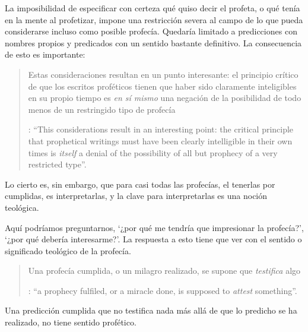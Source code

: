 La imposibilidad de especificar con certeza qué quiso decir el profeta, o qué tenía en la mente al profetizar, impone una restricción severa al campo de lo que pueda considerarse incluso como posible profecía. Quedaría limitado a predicciones con nombres propios y predicados con un sentido bastante definitivo. La consecuencia de esto es importante: \blockquote[{\Cite[31]{anscombe2008faith:prophandmi}}: \enquote{This considerations result in an interesting point: the critical principle that prophetical writings must have been clearly intelligible in their own times is \emph{itself} a denial of the possibility of all but prophecy of a very restricted type}.]{Estas consideraciones resultan en un punto interesante: el principio crítico de que los escritos proféticos tienen que haber sido claramente inteligibles en su propio tiempo es \emph{en sí mismo} una negación de la posibilidad de todo menos de un restringido tipo de profecía}. Lo cierto es, sin embargo, que para casi todas las profecías, el tenerlas por cumplidas, es interpretarlas, y la clave para interpretarlas es una noción teológica.

Aquí podríamos preguntarnos, \enquote*{¿por qué me tendría que impresionar la profecía?}, \enquote*{¿por qué debería interesarme?}. La respuesta a esto tiene que ver con el sentido o significado teológico de la profecía. \blockquote[{\Cite[32]{anscombe2008faith:prophandmi}}: \enquote{a prophecy fulfiled, or a miracle done, is supposed to \emph{attest} something}.]{Una profecía cumplida, o un milagro realizado, se supone que \emph{testifica} algo}. Una predicción cumplida que no testifica nada más allá de que lo predicho se ha realizado, no tiene sentido profético.



